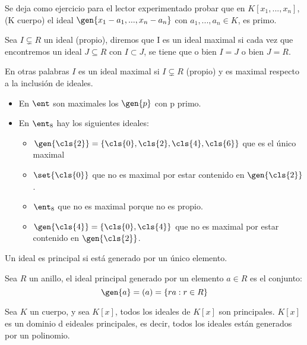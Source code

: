Se deja como ejercicio para el lector experimentado probar que en $K[x_1,...,x_n]$, (K cuerpo) el ideal $\gen{x_1-a_1,...,x_n-a_n}$ con $a_1,...,a_n \in K$, es primo.

\begin{defn} \label{def:IdealMaximal}
	Sea $I \subsetneq R$ un ideal (propio), diremos que I es un ideal maximal si cada vez que encontremos un ideal $J ⊆ R$ con $I \subset J$, se tiene que o bien $I=J$ o bien $J=R$.

	En otras palabras $I$ es un ideal maximal si $I \subsetneq R$  (propio) y es maximal respecto a la inclusión de ideales.
\end{defn}

\begin{example}
	\begin{itemize}
		\item En $\ent$ son maximales los $\gen{p}$ con p primo.
		\item En $\ent_8$ hay los siguientes ideales:
		\begin{itemize}
			\item $\gen{\cls{2}}=\{\cls{0},\cls{2},\cls{4},\cls{6} \}$ que es el único maximal
			\item $\set{\cls{0}}$ que no es maximal por estar contenido en $\gen{\cls{2}}$.
			\item $\ent_8$ que no es maximal porque no es propio.
			\item $\gen{\cls{4}}=\{\cls{0},\cls{4} \}$ que no es maximal por estar contenido en $\gen{\cls{2}}$.
		\end{itemize}
	\end{itemize}
\end{example}

\begin{defn}
	Un ideal es principal si está generado por un único elemento.
\end{defn}

\begin{example}
	Sea $R$ un anillo, el ideal principal generado por un elemento $a \in R$ es el conjunto:
	$$ \gen{a}=(a)=\{ra: r \in R \} $$
\end{example}

\begin{prop}
	Sea $K$ un cuerpo, y sea $K[x]$, todos los ideales de $K[x]$ son principales. $K[x]$ es un dominio d eideales principales, es decir, todos los ideales están generados por un polinomio.
\end{prop}

